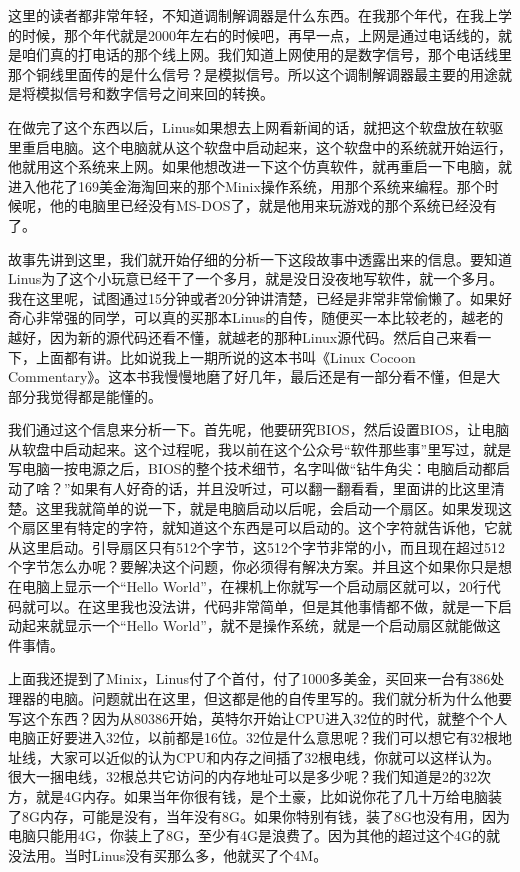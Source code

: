 \documentclass[
  letterpaper,
  DIV=11,
  numbers=noendperiod]{scrreprt}
\begin{document}
这里的读者都非常年轻，不知道调制解调器是什么东西。在我那个年代，在我上学的时候，那个年代就是2000年左右的时候吧，再早一点，上网是通过电话线的，就是咱们真的打电话的那个线上网。我们知道上网使用的是数字信号，那个电话线里那个铜线里面传的是什么信号？是模拟信号。所以这个调制解调器最主要的用途就是将模拟信号和数字信号之间来回的转换。

在做完了这个东西以后，Linus如果想去上网看新闻的话，就把这个软盘放在软驱里重启电脑。这个电脑就从这个软盘中启动起来，这个软盘中的系统就开始运行，他就用这个系统来上网。如果他想改进一下这个仿真软件，就再重启一下电脑，就进入他花了169美金海淘回来的那个Minix操作系统，用那个系统来编程。那个时候呢，他的电脑里已经没有MS-DOS了，就是他用来玩游戏的那个系统已经没有了。

故事先讲到这里，我们就开始仔细的分析一下这段故事中透露出来的信息。要知道Linus为了这个小玩意已经干了一个多月，就是没日没夜地写软件，就一个多月。我在这里呢，试图通过15分钟或者20分钟讲清楚，已经是非常非常偷懒了。如果好奇心非常强的同学，可以真的买那本Linus的自传，随便买一本比较老的，越老的越好，因为新的源代码还看不懂，就越老的那种Linux源代码。然后自己来看一下，上面都有讲。比如说我上一期所说的这本书叫《Linux
Cocoon
Commentary》。这本书我慢慢地磨了好几年，最后还是有一部分看不懂，但是大部分我觉得都是能懂的。

我们通过这个信息来分析一下。首先呢，他要研究BIOS，然后设置BIOS，让电脑从软盘中启动起来。这个过程呢，我以前在这个公众号``软件那些事''里写过，就是写电脑一按电源之后，BIOS的整个技术细节，名字叫做``钻牛角尖：电脑启动都启动了啥？''如果有人好奇的话，并且没听过，可以翻一翻看看，里面讲的比这里清楚。这里我就简单的说一下，就是电脑启动以后呢，会启动一个扇区。如果发现这个扇区里有特定的字符，就知道这个东西是可以启动的。这个字符就告诉他，它就从这里启动。引导扇区只有512个字节，这512个字节非常的小，而且现在超过512个字节怎么办呢？要解决这个问题，你必须得有解决方案。并且这个如果你只是想在电脑上显示一个``Hello
World''，在裸机上你就写一个启动扇区就可以，20行代码就可以。在这里我也没法讲，代码非常简单，但是其他事情都不做，就是一下启动起来就显示一个``Hello
World''，就不是操作系统，就是一个启动扇区就能做这件事情。

上面我还提到了Minix，Linus付了个首付，付了1000多美金，买回来一台有386处理器的电脑。问题就出在这里，但这都是他的自传里写的。我们就分析为什么他要写这个东西？因为从80386开始，英特尔开始让CPU进入32位的时代，就整个个人电脑正好要进入32位，以前都是16位。32位是什么意思呢？我们可以想它有32根地址线，大家可以近似的认为CPU和内存之间插了32根电线，你就可以这样认为。很大一捆电线，32根总共它访问的内存地址可以是多少呢？我们知道是2的32次方，就是4G内存。如果当年你很有钱，是个土豪，比如说你花了几十万给电脑装了8G内存，可能是没有，当年没有8G。如果你特别有钱，装了8G也没有用，因为电脑只能用4G，你装上了8G，至少有4G是浪费了。因为其他的超过这个4G的就没法用。当时Linus没有买那么多，他就买了个4M。
\end{document}
